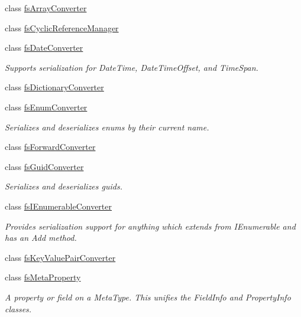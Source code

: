 \begin{DoxyCompactItemize}
\item 
class \hyperlink{class_full_serializer_1_1_internal_1_1fs_array_converter}{fs\+Array\+Converter}
\item 
class \hyperlink{class_full_serializer_1_1_internal_1_1fs_cyclic_reference_manager}{fs\+Cyclic\+Reference\+Manager}
\item 
class \hyperlink{class_full_serializer_1_1_internal_1_1fs_date_converter}{fs\+Date\+Converter}
\begin{DoxyCompactList}\small\item\em Supports serialization for Date\+Time, Date\+Time\+Offset, and Time\+Span. \end{DoxyCompactList}\item 
class \hyperlink{class_full_serializer_1_1_internal_1_1fs_dictionary_converter}{fs\+Dictionary\+Converter}
\item 
class \hyperlink{class_full_serializer_1_1_internal_1_1fs_enum_converter}{fs\+Enum\+Converter}
\begin{DoxyCompactList}\small\item\em Serializes and deserializes enums by their current name. \end{DoxyCompactList}\item 
class \hyperlink{class_full_serializer_1_1_internal_1_1fs_forward_converter}{fs\+Forward\+Converter}
\item 
class \hyperlink{class_full_serializer_1_1_internal_1_1fs_guid_converter}{fs\+Guid\+Converter}
\begin{DoxyCompactList}\small\item\em Serializes and deserializes guids. \end{DoxyCompactList}\item 
class \hyperlink{class_full_serializer_1_1_internal_1_1fs_i_enumerable_converter}{fs\+I\+Enumerable\+Converter}
\begin{DoxyCompactList}\small\item\em Provides serialization support for anything which extends from {\ttfamily I\+Enumerable} and has an {\ttfamily Add} method. \end{DoxyCompactList}\item 
class \hyperlink{class_full_serializer_1_1_internal_1_1fs_key_value_pair_converter}{fs\+Key\+Value\+Pair\+Converter}
\item 
class \hyperlink{class_full_serializer_1_1_internal_1_1fs_meta_property}{fs\+Meta\+Property}
\begin{DoxyCompactList}\small\item\em A property or field on a Meta\+Type. This unifies the Field\+Info and Property\+Info classes. \end{DoxyCompactList}\item 

\end{DoxyCompactItemize}
